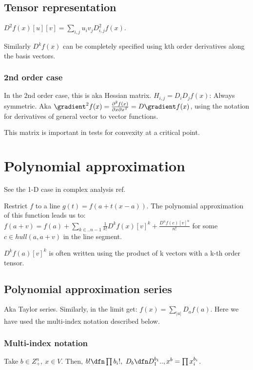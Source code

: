 \documentclass[oneside, article]{memoir}
\begin{document}
\subsection{Tensor representation}
$D^{2}f(x)[u][v] = \sum_{i, j} u_i v_j D_{i, j}^{2}f(x)$. 

Similarly $D^{k}f(x)$ can be completely specified using kth order derivatives along the basis vectors.

\subsubsection{2nd order case}
In the 2nd order case, this is aka Hessian matrix. $H_{i,j} = D_{i}D_{j}f(x)$: Always symmetric. Aka $\gradient^{2} f(x) = \frac{\partial^{2} f(x)}{\partial x \partial x^{T}} = D \gradient f(x)$, using the notation for derivatives of general vector to vector functions.

This matrix is important in tests for convexity at a critical point.

\section{Polynomial approximation}
See the 1-D case in complex analysis ref.

Restrict $f$ to a line $g(t) = f(a + t(x-a))$. The polynomial approximation of this function leads us to: 
$f(a+v) = f(a) + \sum_{k \in ..n-1}\frac{1}{k!}D^{k}f(x)[v]^{k} + \frac{D^{n}f(c)[v]^{n}}{n!}$ for some $c \in hull(a, a+v)$ in the line segment.

$D^{k}f(a)[v]^{k}$ is often written using the product of k vectors with a k-th order tensor.

\subsection{Polynomial approximation series}
Aka Taylor series. Similarly, in the limit get: $f(x) = \sum_{|a|} D_a f(a)$. Here we have used the multi-index notation described below.

\subsubsection{Multi-index notation}
Take $b \in Z_+^{n},\ x \in V$. Then, $b! \dfn \prod b_i !,\ D_{b} \dfn D_{1}^{b_1}.., x^{b} = \prod x_i^{b_i}$.
\end{document}
